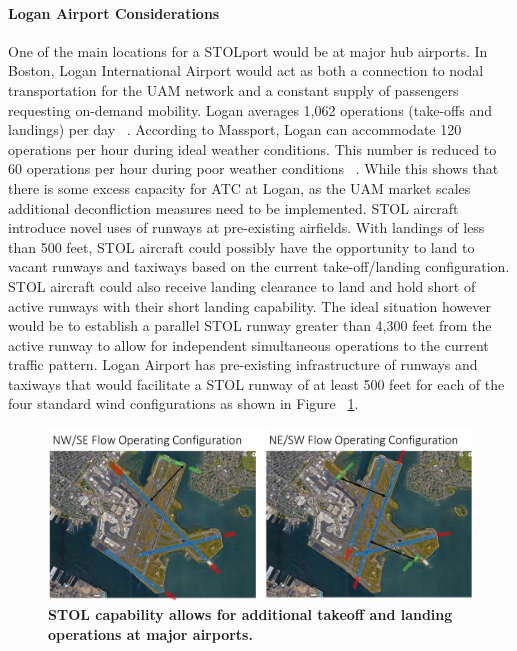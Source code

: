 \documentclass[]{aiaa-tc}%
\begin{document}
\paragraph{Logan Airport Considerations}
One of the main locations for a STOLport would be at major hub airports. In Boston, Logan International Airport would act as both a connection to nodal transportation for the UAM network and a constant supply of passengers requesting on-demand mobility. Logan averages 1,062 operations (take-offs and landings) per day ~\cite{LoganStats}. According to Massport, Logan can accommodate 120 operations per hour during ideal weather conditions. This number is reduced to 60 operations per hour during poor weather conditions ~\cite{LoganOps}. While this shows that there is some excess capacity for ATC at Logan, as the UAM market scales additional deconfliction measures need to be implemented.
STOL aircraft introduce novel uses of runways at pre-existing airfields. With landings of less than 500 feet, STOL aircraft could possibly have the opportunity to land to vacant runways and taxiways based on the current take-off/landing configuration. STOL aircraft could also receive landing clearance to land and hold short of active runways with their short landing capability. The ideal situation however would be to establish a parallel STOL runway greater than 4,300 feet from the active runway to allow for independent simultaneous operations to the current traffic pattern. Logan Airport has pre-existing infrastructure of runways and taxiways that would facilitate a STOL runway of at least 500 feet for each of the four standard wind configurations as shown in Figure ~\ref{f:logan}.
\begin{figure}[h!]
	\begin{center}
	\includegraphics[width=1.0\textwidth]{Logan Independent Ops.pdf}
    \caption{\textbf{STOL capability allows for additional takeoff and landing operations at major airports.}}
	\label{f:logan}
	\end{center}
\end{figure}
\end{document}
